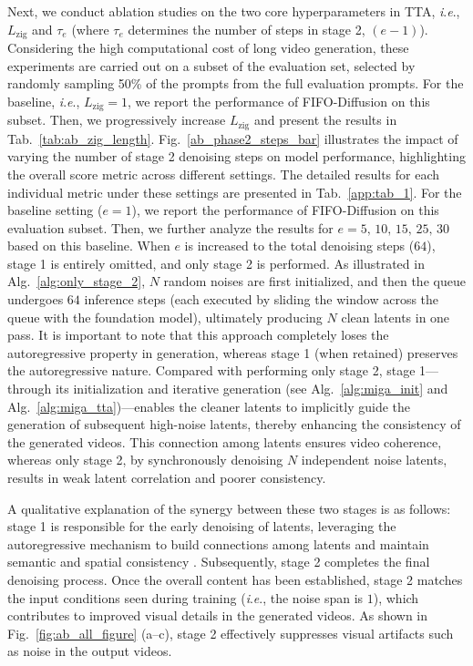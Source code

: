 \documentclass{article}
\theoremstyle{plain}
\theoremstyle{definition}
\theoremstyle{remark}
\newcommand{\ie}{\textit{i}.\textit{e}.}
\begin{document}
Next, we conduct ablation studies on the two core hyperparameters in TTA, \ie, $L_{\mathrm{zig}}$ and $\tau_e$ (where $\tau_e$ determines the number of steps in stage 2, $(e-1)$).
Considering the high computational cost of long video generation, these experiments are carried out on a subset of the evaluation set, selected by randomly sampling 50\% of the prompts from the full evaluation prompts.
For the baseline, \ie, $L_{\mathrm{zig}}=1$, we report the performance of FIFO-Diffusion on this subset.
Then, we progressively increase $L_{\mathrm{zig}}$ and present the results in Tab.~\ref{tab:ab_zig_length}.
Fig.~\ref{ab_phase2_steps_bar} illustrates the impact of varying the number of stage 2 denoising steps on model performance, highlighting the overall score metric across different settings. The detailed results for each individual metric under these settings are presented in Tab.~\ref{app:tab_1}.
For the baseline setting ($e=1$), we report the performance of FIFO-Diffusion on this evaluation subset. Then, we further analyze the results for $e=5,\,10,\,15,\,25,\,30$ based on this baseline. When $e$ is increased to the total denoising steps ($64$), stage 1 is entirely omitted, and only stage 2 is performed. 
As illustrated in Alg.~\ref{alg:only_stage_2}, $N$ random noises are first initialized, and then the queue undergoes $64$ inference steps (each executed by sliding the window across the queue with the foundation model), ultimately producing $N$ clean latents in one pass. 
It is important to note that this approach completely loses the autoregressive property in generation, whereas stage 1 (when retained) preserves the autoregressive nature. Compared with performing only stage 2, stage 1—through its initialization and iterative generation (see Alg.~\ref{alg:miga_init} and Alg.~\ref{alg:miga_tta})—enables the cleaner latents to implicitly guide the generation of subsequent high-noise latents, thereby enhancing the consistency of the generated videos. This connection among latents ensures video coherence, whereas only stage 2, by synchronously denoising $N$ independent noise latents, results in weak latent correlation and poorer consistency.

A qualitative explanation of the synergy between these two stages is as follows: stage 1 is responsible for the early denoising of latents, leveraging the autoregressive mechanism to build connections among latents and maintain semantic and spatial consistency \cite{qiu2023freenoise}. Subsequently, stage 2 completes the final denoising process. Once the overall content has been established, stage 2 matches the input conditions seen during training (\ie, the noise span is $1$), which contributes to improved visual details in the generated videos. As shown in Fig.~\ref{fig:ab_all_figure} (a–c), stage 2 effectively suppresses visual artifacts such as noise in the output videos.
\end{document}
